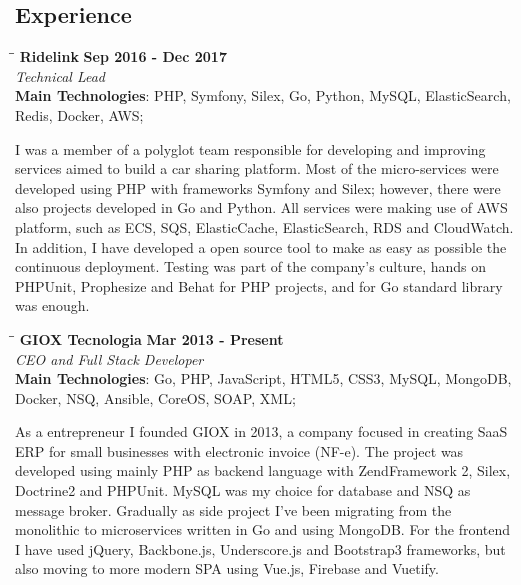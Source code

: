 \documentclass[margin]{res}
\begin{document}
\begin{resume}
\section{Experience}
\vspace{-0.1in}
    \begin{tabbing}
    \hspace{2.3in}\= \hspace{1.7in}\= \kill %
    \textbf{Ridelink}    \>\>\textbf{Sep 2016 - Dec 2017}\\
    \textit{Technical Lead}\\
    \textbf{Main Technologies}: PHP, Symfony, Silex, Go, Python, MySQL, ElasticSearch, \\Redis, Docker, AWS;
    \end{tabbing}\vspace{-20pt}      %
    \vspace{2mm}
I was a member of a polyglot team responsible for developing and improving services aimed to build a car sharing platform. Most of the micro-services were developed using PHP with frameworks Symfony and Silex; however, there were also projects developed in Go and Python. All services were making use of AWS platform, such as ECS, SQS, ElasticCache, ElasticSearch, RDS and CloudWatch. In addition, I have developed a open source tool to make as easy as possible the continuous deployment. Testing was part of the company’s culture, hands on PHPUnit, Prophesize and Behat for PHP projects, and for Go standard library was enough.

\vspace{-0.1in}
    \begin{tabbing}
    \hspace{2.3in}\= \hspace{1.7in}\= \kill
    \textbf{GIOX Tecnologia}    \>\>\textbf{Mar 2013 - Present}\\
    \textit{CEO and Full Stack Developer}\\
    \textbf{Main Technologies}: Go, PHP, JavaScript, HTML5, CSS3, MySQL, MongoDB, \\Docker, NSQ, Ansible, CoreOS, SOAP, XML;
    \end{tabbing}\vspace{-20pt}
    \vspace{2mm}
As a entrepreneur I founded GIOX in 2013, a company focused in creating SaaS ERP for small businesses with electronic invoice (NF-e). The project was developed using mainly PHP as backend language with ZendFramework 2, Silex, Doctrine2 and PHPUnit. MySQL was my choice for database and NSQ as message broker. Gradually as side project I've been migrating from the monolithic to microservices written in Go and using MongoDB. For the frontend I have used jQuery, Backbone.js, Underscore.js and Bootstrap3 frameworks, but also moving to more modern SPA using Vue.js, Firebase and Vuetify.


\end{resume}
\end{document}
